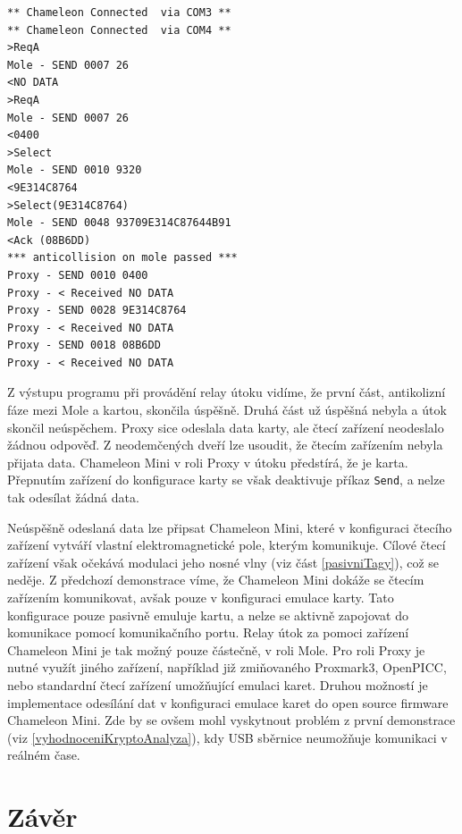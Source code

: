 \begin{lstlisting}[caption=Výstup programu MifareProxy.exe při demonstraci, label={relayZaznam}]
** Chameleon Connected  via COM3 **
** Chameleon Connected  via COM4 **
>ReqA
Mole - SEND 0007 26
<NO DATA
>ReqA
Mole - SEND 0007 26
<0400
>Select
Mole - SEND 0010 9320
<9E314C8764
>Select(9E314C8764)
Mole - SEND 0048 93709E314C87644B91
<Ack (08B6DD)
*** anticollision on mole passed ***
Proxy - SEND 0010 0400
Proxy - < Received NO DATA
Proxy - SEND 0028 9E314C8764
Proxy - < Received NO DATA
Proxy - SEND 0018 08B6DD
Proxy - < Received NO DATA
\end{lstlisting}
Z výstupu programu při provádění relay útoku vidíme, že první část, antikolizní fáze mezi Mole a kartou, skončila úspěšně. Druhá část už úspěšná nebyla a útok skončil neúspěchem. Proxy sice odeslala data karty, ale čtecí zařízení neodeslalo žádnou odpověď. Z neodemčených dveří lze usoudit, že čtecím zařízením nebyla přijata data. Chameleon Mini v roli Proxy v útoku předstírá, že je karta. Přepnutím zařízení do konfigurace karty se však deaktivuje příkaz \verb|Send|, a nelze tak odesílat žádná data. \par
Neúspěšně odeslaná data lze připsat Chameleon Mini, které v konfiguraci čtecího zařízení vytváří vlastní elektromagnetické pole, kterým komunikuje. Cílové čtecí zařízení však očekává modulaci jeho nosné vlny (viz část \ref{pasivniTagy}), což se neděje. Z předchozí demonstrace víme, že Chameleon Mini dokáže se čtecím zařízením komunikovat, avšak pouze v konfiguraci emulace karty. Tato konfigurace pouze pasivně emuluje kartu, a nelze se aktivně zapojovat do komunikace pomocí komunikačního portu. Relay útok za pomoci zařízení Chameleon Mini je tak možný pouze částečně, v roli Mole. Pro roli Proxy je nutné využít jiného zařízení, například již zmiňovaného Proxmark3, OpenPICC, nebo standardní čtecí zařízení umožňující emulaci karet. Druhou možností je implementace odesílání dat v konfiguraci emulace karet do open source firmware Chameleon Mini. Zde by se ovšem mohl vyskytnout problém z první demonstrace (viz \ref{vyhodnoceniKryptoAnalyza}), kdy USB sběrnice neumožňuje komunikaci v reálném čase.

\chapter{Závěr}
\label{zaver}


